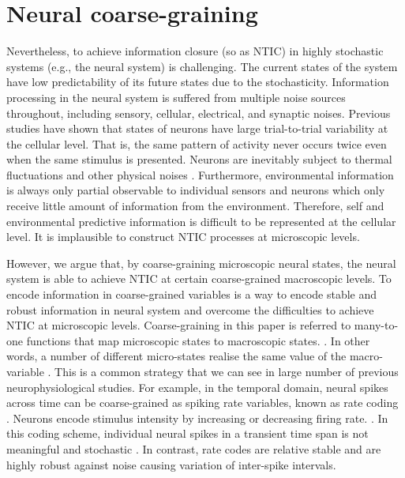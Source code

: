 \documentclass[utf8]{article}
\newcommand{\needref}[1]{%
			\ifthenelse{\equal{#1}{}}{%
				\todo[color=White, linecolor=Orange, bordercolor=Orange]{\textcolor{Orange}{Ref}}}{%
				\todo[color=White, linecolor=Orange, bordercolor=Orange]{\textcolor{Orange}{Ref: #1}}%
			}%
		}
\begin{document}
	\section{Neural coarse-graining}

		Nevertheless, to achieve information closure (so as NTIC) in highly stochastic systems (e.g., the neural system) is challenging. The current states of the system have low predictability of its future states due to the stochasticity. Information processing in the neural system is suffered from multiple noise sources throughout, including sensory, cellular, electrical, and synaptic noises. Previous studies have shown that states of neurons have large trial-to-trial variability at the cellular level. That is, the same pattern of activity never occurs twice even when the same stimulus is presented. Neurons are inevitably subject to thermal fluctuations and other physical noises \citep{faisal2008noise}. Furthermore, environmental information is always only partial observable to individual sensors and neurons which only receive little amount of information from the environment. Therefore, self and environmental predictive information is difficult to be represented at the cellular level. It is implausible to construct NTIC processes at microscopic levels.

		However, we argue that, by coarse-graining microscopic neural states, the neural system is able to achieve NTIC at certain coarse-grained macroscopic levels. To encode information in coarse-grained variables is a way to encode stable and robust information in neural system and overcome the difficulties to achieve NTIC at microscopic levels. Coarse-graining in this paper is referred to many-to-one functions that map microscopic states to macroscopic states.\needref{Do we need reference?}. In other words, a number of different micro-states realise the same value of the macro-variable \citep{price2007causation}. This is a common strategy that we can see in large number of previous neurophysiological studies. For example, in the temporal domain, neural spikes across time can be coarse-grained as spiking rate variables, known as rate coding \citep{adrian1926impulses, gerstner2002spiking, maass2001pulsed, panzeri2015neural, stein2005neuronal}. Neurons encode stimulus intensity by increasing or decreasing firing rate. \citep{kandel2000principles}. In this coding scheme, individual neural spikes in a transient time span is not meaningful and stochastic \citep{stein2005neuronal}. In contrast, rate codes are relative stable and are highly robust against noise causing variation of inter-spike intervals. 
		
\end{document}
